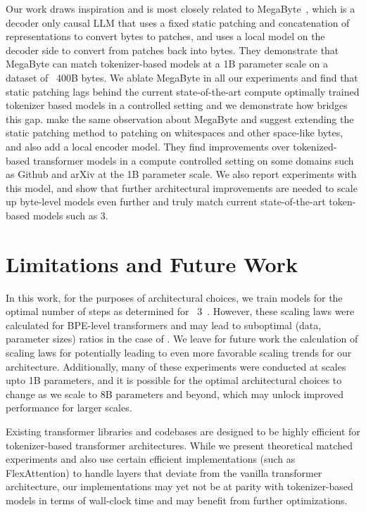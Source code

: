 \documentclass[]{fairmeta}
\begin{document}
Our work draws inspiration and is most closely related to MegaByte~\citep{yu2023megabyte}, which is a decoder only causal LLM that uses a fixed static patching and concatenation of representations to convert bytes to patches, and uses a local model on the decoder side to convert from patches back into bytes. They demonstrate that MegaByte can match tokenizer-based models at a 1B parameter scale on a dataset of ~400B bytes. We ablate MegaByte in all our experiments and find that static patching lags behind the current state-of-the-art compute optimally trained tokenizer based models in a \flop{} controlled setting and we demonstrate how \model{} bridges this gap. \cite{slagle2024spacebyte} make the same observation about MegaByte and suggest extending the static patching method to patching on whitespaces and other space-like bytes, and also add a local encoder model. They find improvements over tokenized-based transformer models in a compute controlled setting on some domains such as Github and arXiv at the 1B parameter scale. We also report experiments with this model, and show that further architectural improvements are needed to scale up byte-level models even further and truly match current state-of-the-art token-based models such as \llama{} 3.

\section{Limitations and Future Work}

In this work, for the purposes of architectural choices, we train models for the optimal number of steps as determined for \llama{}~3~\citep{dubey2024llama}. However, these scaling laws were calculated for BPE-level transformers and may lead to suboptimal (data, parameter sizes) ratios in the case of \model{}. We leave for future work the calculation of scaling laws for \model{} potentially leading to even more favorable scaling trends for our architecture. Additionally, many of these experiments were conducted at scales upto 1B parameters, and it is possible for the optimal architectural choices to change as we scale to 8B parameters and beyond, which may unlock improved performance for larger scales. 

Existing transformer libraries and codebases are designed to be highly efficient for tokenizer-based transformer architectures. While we present theoretical \flop{} matched experiments and also use certain efficient implementations (such as FlexAttention) to handle layers that deviate from the vanilla transformer architecture, our implementations may yet not be at parity with tokenizer-based models in terms of wall-clock time and may benefit from further optimizations. 
\end{document}
